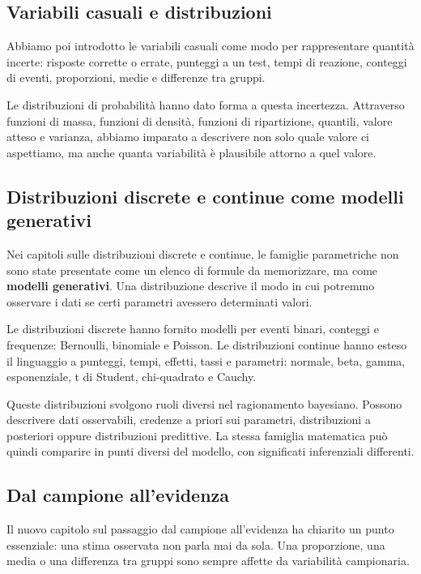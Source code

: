 \documentclass[
  italian,
  letterpaper,
  a4paper,
  11pt,
  open=any]{scrbook}
\theoremstyle{plain}
\theoremstyle{definition}
\theoremstyle{definition}
\theoremstyle{remark}
\begin{document}
\subsection*{Variabili casuali e
distribuzioni}\label{variabili-casuali-e-distribuzioni}

Abbiamo poi introdotto le variabili casuali come modo per rappresentare
quantità incerte: risposte corrette o errate, punteggi a un test, tempi
di reazione, conteggi di eventi, proporzioni, medie e differenze tra
gruppi.

Le distribuzioni di probabilità hanno dato forma a questa incertezza.
Attraverso funzioni di massa, funzioni di densità, funzioni di
ripartizione, quantili, valore atteso e varianza, abbiamo imparato a
descrivere non solo quale valore ci aspettiamo, ma anche quanta
variabilità è plausibile attorno a quel valore.

\subsection*{Distribuzioni discrete e continue come modelli
generativi}\label{distribuzioni-discrete-e-continue-come-modelli-generativi}

Nei capitoli sulle distribuzioni discrete e continue, le famiglie
parametriche non sono state presentate come un elenco di formule da
memorizzare, ma come \textbf{modelli generativi}. Una distribuzione
descrive il modo in cui potremmo osservare i dati se certi parametri
avessero determinati valori.

Le distribuzioni discrete hanno fornito modelli per eventi binari,
conteggi e frequenze: Bernoulli, binomiale e Poisson. Le distribuzioni
continue hanno esteso il linguaggio a punteggi, tempi, effetti, tassi e
parametri: normale, beta, gamma, esponenziale, t di Student,
chi-quadrato e Cauchy.

Queste distribuzioni svolgono ruoli diversi nel ragionamento bayesiano.
Possono descrivere dati osservabili, credenze a priori sui parametri,
distribuzioni a posteriori oppure distribuzioni predittive. La stessa
famiglia matematica può quindi comparire in punti diversi del modello,
con significati inferenziali differenti.

\subsection*{Dal campione all'evidenza}\label{dal-campione-allevidenza}

Il nuovo capitolo sul passaggio dal campione all'evidenza ha chiarito un
punto essenziale: una stima osservata non parla mai da sola. Una
proporzione, una media o una differenza tra gruppi sono sempre affette
da variabilità campionaria.
\end{document}

